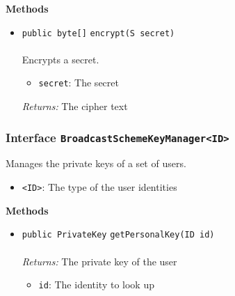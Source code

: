 \textbf{\sffamily Methods}
\begin{itemize}
\item \lstinline|public byte[]| \lstinline|encrypt|\lstinline|(S secret)|\\ \\[-0.6em]
Encrypts a secret.
\begin{itemize}
\item \lstinline|secret|: The secret
\end{itemize}

\emph{Returns:} The cipher text

\end{itemize}

\subsubsection{Interface \lstinline|BroadcastSchemeKeyManager<ID>|}
Manages the private keys of a set of users. \\
\noindent\begin{minipage}[t]{5cm}
\vspace{0.3em}
\hspace*{2em}
\vspace{0.3em}
\end{minipage}

\begin{itemize}
\item \lstinline|<ID>|: The type of the user identities
\end{itemize}




\textbf{\sffamily Methods}
\begin{itemize}
\item \lstinline|public PrivateKey| \lstinline|getPersonalKey|\lstinline|(ID id)|\\ \\[-0.6em]
\emph{Returns:} The private key of the user
\begin{itemize}
\item \lstinline|id|: The identity to look up
\end{itemize}



\end{itemize}

